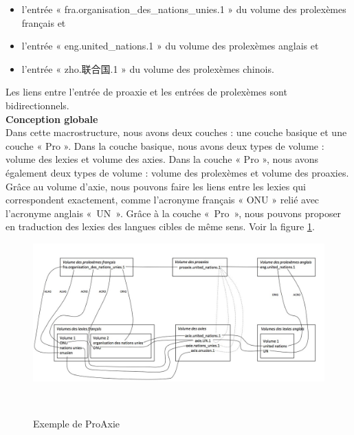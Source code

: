 \documentclass[10pt,a4paper,twoside]{article}
\newcommand{\Chinois}[1]{{\fontspec[Scale=0.9]{STSong}#1}}
\begin{document}
\begin{itemize}
\item l’entrée « fra.organisation\_des\_nations\_unies.1 » du volume des prolexèmes français et 
\item l’entrée « eng.united\_nations.1 » du volume des prolexèmes anglais et
\item l’entrée « zho.\Chinois{联合国}.1 » du volume des prolexèmes chinois.
\end{itemize}
Les liens entre l'entrée de proaxie et les entrées de prolexèmes sont bidirectionnels.\\

\textbf{Conception globale}\\
Dans cette macrostructure, nous avons deux couches : une couche basique et une couche « Pro ».  Dans la couche basique, nous avons deux types de volume : volume des lexies et volume des axies. Dans la couche « Pro », nous avons également deux types de volume : volume des prolexèmes et volume des proaxies.
Grâce au volume d'axie, nous pouvons faire les liens entre les lexies qui correspondent exactement, comme l'acronyme français « ONU » relié avec l'acronyme anglais « UN ». Grâce à la couche « Pro »,  nous pouvons proposer en traduction des lexies des langues cibles de même sens.  Voir la figure \ref{image-proaxie}.

\begin{figure}[htbp] 
\begin{center} 
\includegraphics[width=14cm]{images/proaxie_2-etages.jpg}
\end{center} 
\caption{Exemple de ProAxie} \label{image-proaxie} \
\end{figure}
\end{document}
